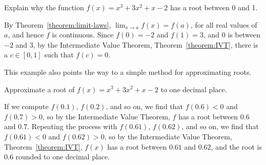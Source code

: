 \begin{example} 
Explain why the function $f(x) =x^3 + 3x^2+x-2$ has a root between 0
and 1.
\end{example}

\begin{solution}
By Theorem~\ref{theorem:limit-laws}, $\lim_{x\to a} f(x) = f(a)$, for
all real values of $a$, and hence $f$ is continuous.  Since $f(0)=-2$
and $f(1)=3$, and $0$ is between $-2$ and $3$, by the Intermediate
Value Theorem, Theorem~\ref{theorem:IVT}, there is a $c\in[0,1]$ such
that $f(c)=0$.
\end{solution}

This example also points the way to a simple method for approximating
roots. 

\begin{example} 
Approximate a root of $f(x) =x^3 + 3x^2+x-2$ to one decimal place.
\end{example}
\begin{solution}
If we compute $f(0.1)$, $f(0.2)$, and so on, we find that $f(0.6)<0$
and $f(0.7)>0$, so by the Intermediate Value Theorem, $f$ has a root
between $0.6$ and $0.7$. Repeating the process with $f(0.61)$,
$f(0.62)$, and so on, we find that $f(0.61)<0$ and $f(0.62)>0$, so by
the Intermediate Value Theorem, Theorem~\ref{theorem:IVT}, $f(x)$ has
a root between $0.61$ and $0.62$, and the root is $0.6$ rounded to one
decimal place.
\end{solution}





